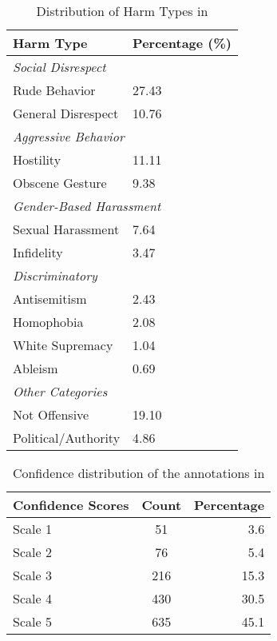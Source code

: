 \begin{table}[h]
\centering
\small
\begin{tabular}{ll}
\hline
\textbf{Harm Type} & \textbf{Percentage (\%)} \\
\hline
\multicolumn{2}{l}{\textit{Social Disrespect}} \\
\quad Rude Behavior & 27.43 \\
\quad General Disrespect & 10.76 \\
\hline
\multicolumn{2}{l}{\textit{Aggressive Behavior}} \\
\quad Hostility & 11.11 \\
\quad Obscene Gesture & 9.38 \\
\hline
\multicolumn{2}{l}{\textit{Gender-Based Harassment}} \\
\quad Sexual Harassment & 7.64 \\
\quad Infidelity & 3.47 \\
\hline
\multicolumn{2}{l}{\textit{Discriminatory}} \\
\quad Antisemitism & 2.43 \\
\quad Homophobia & 2.08 \\
\quad White Supremacy & 1.04 \\
\quad Ableism & 0.69 \\
\hline
\multicolumn{2}{l}{\textit{Other Categories}} \\
\quad Not Offensive & 19.10 \\
\quad Political/Authority & 4.86 \\
\hline
\end{tabular}
\caption{Distribution of Harm Types in \offHandsDataset}
\label{app:tab:harm-types-hierarchical}
\end{table}



\begin{table}[!htbp]
\centering
\small
\begin{tabular}{@{}lcr@{}}
\hline
\textbf{Confidence Scores} & \textbf{Count} & \textbf{Percentage} \\
\hline
Scale 1	& 51 & 3.6 \\
Scale 2 & 76 &	5.4 \\
Scale 3 & 	216	& 15.3 \\
Scale 4	& 430	& 30.5 \\
Scale 5 & 	635 &	45.1 \\
\hline
\end{tabular}
\caption{Confidence distribution of the annotations in \offHandsDataset}
\label{tab:conf_summary}
\end{table}


